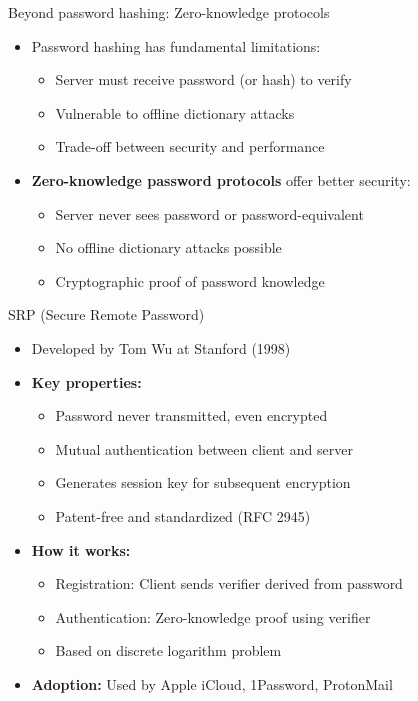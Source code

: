 \documentclass[aspectratio=169, lualatex, handout]{beamer}
\begin{document}
\begin{frame}{Beyond password hashing: Zero-knowledge protocols}
	\begin{itemize}
		\item Password hashing has fundamental limitations:
		      \begin{itemize}
			      \item Server must receive password (or hash) to verify
			      \item Vulnerable to offline dictionary attacks
			      \item Trade-off between security and performance
		      \end{itemize}
		\item \textbf{Zero-knowledge password protocols} offer better security:
		      \begin{itemize}
			      \item Server never sees password or password-equivalent
			      \item No offline dictionary attacks possible
			      \item Cryptographic proof of password knowledge
		      \end{itemize}
	\end{itemize}
\end{frame}

\begin{frame}{SRP (Secure Remote Password)}
	\begin{itemize}
		\item Developed by Tom Wu at Stanford (1998)
		\item \textbf{Key properties:}
		      \begin{itemize}
			      \item Password never transmitted, even encrypted
			      \item Mutual authentication between client and server
			      \item Generates session key for subsequent encryption
			      \item Patent-free and standardized (RFC 2945)
		      \end{itemize}
		\item \textbf{How it works:}
		      \begin{itemize}
			      \item Registration: Client sends verifier derived from password
			      \item Authentication: Zero-knowledge proof using verifier
			      \item Based on discrete logarithm problem
		      \end{itemize}
		\item \textbf{Adoption:} Used by Apple iCloud, 1Password, ProtonMail
	\end{itemize}
\end{frame}
\end{document}
